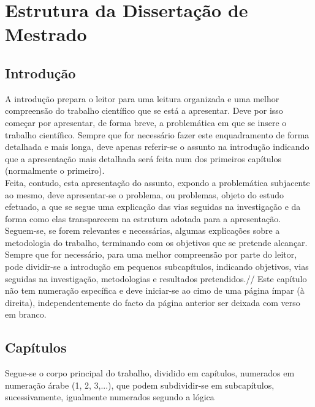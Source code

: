 % 
\chapter{Estrutura da Dissertação de Mestrado} %
\label{chap:Chapter1} %


%
\section{Introdução} 
\label{sec:chap1_introduction} %

A introdução prepara o leitor para uma leitura organizada e uma melhor compreensão do trabalho científico que se está a apresentar. Deve por isso começar por apresentar, de forma breve, a problemática em que se insere o trabalho científico.
Sempre que for necessário fazer este enquadramento de forma detalhada e mais longa, deve apenas referir-se o assunto na introdução indicando que a apresentação mais detalhada será feita num dos primeiros capítulos (normalmente o primeiro).\\ Feita, contudo, esta apresentação do assunto, expondo a problemática subjacente ao mesmo, deve apresentar-se o problema, ou problemas, objeto do estudo efetuado, a que se segue uma explicação das vias seguidas na investigação e da forma como elas transparecem na estrutura adotada para a apresentação. Seguem-se, se forem relevantes e necessárias, algumas explicações sobre a metodologia do trabalho, terminando com os objetivos que se pretende alcançar. Sempre que for necessário, para uma melhor compreensão por parte do leitor, pode dividir-se a introdução em pequenos subcapítulos, indicando objetivos, vias seguidas na investigação, metodologias e resultados pretendidos.//
Este capítulo não tem numeração específica e deve iniciar-se ao cimo de uma página ímpar (à direita), independentemente do facto da página anterior ser deixada com verso em branco. 



\section{Capítulos}

Segue-se o corpo principal do trabalho, dividido em capítulos, numerados em numeração árabe (1, 2, 3,...), que podem subdividir-se em subcapítulos, sucessivamente, igualmente numerados segundo a lógica

